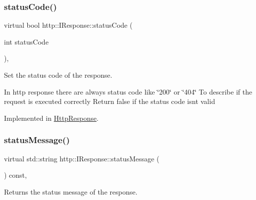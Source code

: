 \mbox{\label{structhttp_1_1IResponse_a7d85b2b27acb82d13cf26eb0d3801735}} 
\subsubsection{\texorpdfstring{status\+Code()}{statusCode()}\hspace{0.1cm}{\footnotesize\ttfamily [2/2]}}
{\footnotesize\ttfamily virtual bool http\+::\+I\+Response\+::status\+Code (\begin{DoxyParamCaption}\item[{int}]{status\+Code }\end{DoxyParamCaption})\hspace{0.3cm}{\ttfamily [pure virtual]}, {\ttfamily [noexcept]}}



Set the status code of the response. 

In http response there are always status code like \char`\"{}200\char`\"{} or \char`\"{}404\char`\"{} To describe if the request is executed correctly Return false if the status code isn\textquotesingle{}t valid 

Implemented in \hyperlink{classHttpResponse_a8a6cc8f27e81ca4d2ef4ec60450974d1}{Http\+Response}.

\mbox{\label{structhttp_1_1IResponse_a4339fd29b105c9ea5319b2e01f27290c}} 
\subsubsection{\texorpdfstring{status\+Message()}{statusMessage()}\hspace{0.1cm}{\footnotesize\ttfamily [1/2]}}
{\footnotesize\ttfamily virtual std\+::string http\+::\+I\+Response\+::status\+Message (\begin{DoxyParamCaption}{ }\end{DoxyParamCaption}) const\hspace{0.3cm}{\ttfamily [pure virtual]}, {\ttfamily [noexcept]}}



Returns the status message of the response. 

